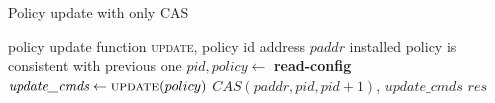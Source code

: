 \documentclass[conference]{sigcomm-alternate}
\newcommand{\hide}[1]{}
\newcommand{\paddr}{\textit{paddr}\xspace}
\newcommand{\pid}{\textit{pid}\xspace}
\newcommand{\ufunc}{update} %
\newcommand{\liron}[1]{\textit{\textcolor{mygreen}{[liron]: #1}}} %
\newcommand{\petr}[1]{\textit{\textcolor{blue}{[petr]: #1}}} %
\newcommand{\ack}{\textit{ack}}
\begin{document}





{\small
\begin{algorithm}[t]
    \caption{Policy update with only CAS}
    \label{alg:simple-update}
    \begin{algorithmic}[1]
    \Require policy update function \textsc{\ufunc}, policy id address $\paddr$
    \Ensure installed policy is consistent with previous one
 		\Repeat
 			\State $\pid,\textit{policy}\gets$ \textbf{read-config} %
 			\State $\textit{update\_cmds}\gets \textsc{\ufunc}(policy)$
 			\startTxn
	 			\State $CAS(\paddr,\pid,\pid+1)$,
	 			\State $\textit{update\_cmds}$ %
 			\endTxn
     	\Until{$\textit{res}=\ack$}
			\Return $\textit{res}$

    \end{algorithmic}
\end{algorithm}
}

%
\hide{
It takes a set of rules $U$ (not yet a policy)and proceeds as follows: first, we seek to
 obtain a unique \emph{id}. FIXME: to be continued...
 \textbf{LS: I am not sure if I need to tell every step of the story or maybe it best to explain the main dif from the previous one similarly to what I just wrote next}.
}
%
\end{document}
